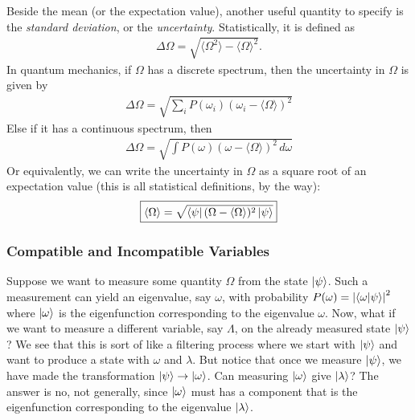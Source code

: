 \documentclass{book}
\theoremstyle{definition}
\begin{document}
Beside the mean (or the expectation value), another useful quantity to specify is the \textit{standard deviation}, or the \textit{uncertainty}. Statistically, it is defined as
\begin{align}
\Delta \Omega = \sqrt{\langle \Omega^2 \rangle - \langle \Omega \rangle^2}.
\end{align}
In quantum mechanics, if $\Omega$ has a discrete spectrum, then the uncertainty in $\Omega$ is given by
\begin{align}
\boxed{\Delta \Omega= \sqrt{ \sum_i P(\omega_i) (\omega_i - \langle \Omega \rangle)^2  }}
\end{align}
Else if it has a continuous spectrum, then
\begin{align}
\boxed{\Delta \Omega  = \sqrt{\int P(\omega)(\omega - \langle \Omega\rangle)^2\,d\omega}}
\end{align}
Or equivalently, we can write the uncertainty in $\Omega$ as a square root of an expectation value (this is all statistical definitions, by the way):
\begin{align}
\boxed{\langle \Omega\rangle = \sqrt{ \bra{\psi}  (\Omega - \langle \Omega \rangle)^2  \ket{\psi}}}
\end{align}










\subsubsection{Compatible and Incompatible Variables}


Suppose we want to measure some quantity $\Omega$ from the state $\ket{\psi}$. Such a measurement can yield an eigenvalue, say $\omega$, with probability $P(\omega)= \abs{\braket{\omega}{\psi}}^2$ where $\ket{\omega}$ is the eigenfunction corresponding to the eigenvalue $\omega$. Now, what if we want to measure a different variable, say $\Lambda$, on the already measured state $\ket{\psi}$? We see that this is sort of like a filtering process where we start with $\ket{\psi}$ and want to produce a state with $\omega$ and $\lambda$. But notice that once we measure $\ket{\psi}$, we have made the transformation $\ket{\psi} \to \ket{\omega}$. Can measuring $\ket{\omega}$ give $\ket{\lambda}$? The answer is no, not generally, since $\ket{\omega}$ must has a component that is the eigenfunction corresponding to the eigenvalue $\ket{\lambda}$. \\
\end{document}
